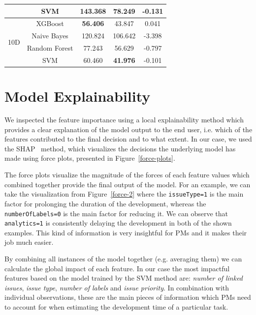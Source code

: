 \documentclass[conference,compsoc]{IEEEtran}
\begin{document}
\begin{table}[!t]
\begin{tabular}{c|c|c|c|c}
		& SVM & 143.368 & \textbf{78.249} & -0.131 \\
		\hline
		\multirow{4}{*}{10D}
		&XGBoost& \textbf{56.406} & 43.847 & 0.041 \\
		&Naive Bayes& 120.824 & 106.642 & -3.398 \\
		&Random Forest& 77.243 & 56.629 & -0.797 \\
		& SVM & 60.460 & \textbf{41.976} & -0.101 \\
	\end{tabular}
\end{table}

\section{Model Explainability}
We inspected the feature importance using a local explainability method which provides a clear explanation of the model output to the end user, i.e. which of the features contributed to the final decision and to what extent. In our case, we used the SHAP~\cite{lundberg2020local2global} method, which visualizes the decisions the underlying model has made using force plots, presented in Figure~\ref{force-plots}.

The force plots visualize the magnitude of the forces of each feature values which combined together provide the final output of the model. For an example, we can take the visualization from Figure~\ref{force-2} where the \texttt{issueType=1} is the main factor for prolonging the duration of the development, whereas the \texttt{numberOfLabels=0} is the main factor for reducing it. We can observe that \texttt{analytics=1} is consistently delaying the development in both of the shown examples. This kind of information is very insightful for PMs and it makes their job much easier.

By combining all instances of the model together (e.g. averaging them) we can calculate the global impact of each feature. In our case the most impactful features based on the model trained by the SVM method are: \textit{number of linked issues}, \textit{issue type}, \textit{number of labels} and \textit{issue priority}. In combination with individual observations, these are the main pieces of information which PMs need to account for when estimating the development time of a particular task.
\end{document}
